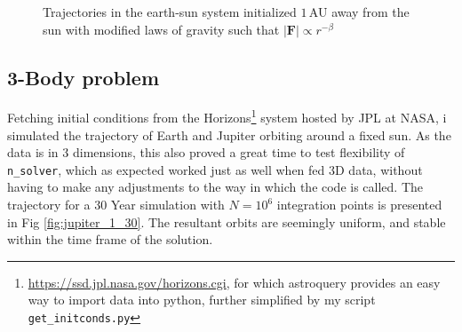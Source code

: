 \documentclass[10pt,showpacs,preprintnumbers,amsmath,amssymb,nofootinbib,aps,prl,twocolumn,groupedaddress,superscriptaddress,showkeys]{revtex4-1}
\begin{document}
\begin{figure}[h!p]
      \caption{Trajectories in the earth-sun system initialized $1\,$AU away from the sun with modified laws of gravity such that $|\mathbf F|\propto r^{-\beta}$}
      \label{fig: escapevel varbeta}
    \end{figure}

\subsection{3-Body problem}
  Fetching initial conditions from the Horizons\footnote{\url{https://ssd.jpl.nasa.gov/horizons.cgi}, for which astroquery provides an easy way to import data into python, further simplified by my script \lstinline{get_initconds.py}} system hosted by JPL at NASA, i simulated the trajectory of Earth and Jupiter orbiting around a fixed sun. As the data is in 3 dimensions, this also proved a great time to test flexibility of \lstinline{n_solver}, which as expected worked just as well when fed 3D data, without having to make any adjustments to the way in which the code is called. The trajectory for a 30 Year simulation with $N=10^6$ integration points is presented in Fig \ref{fig:jupiter_1_30}.
  The resultant orbits are seemingly uniform, and stable within the time frame of the solution.
\end{document}
